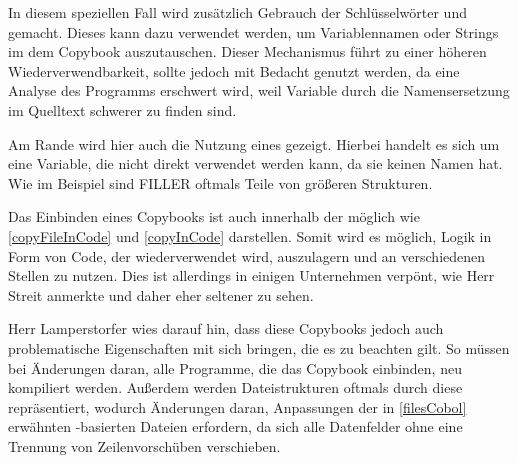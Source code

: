 In diesem speziellen Fall wird zusätzlich Gebrauch der Schlüsselwörter  und  gemacht. Dieses kann dazu verwendet werden, um Variablennamen oder Strings im dem Copybook auszutauschen. Dieser Mechanismus führt zu einer höheren Wiederverwendbarkeit, sollte jedoch mit Bedacht genutzt werden, da eine Analyse des Programms erschwert wird, weil Variable durch die Namensersetzung im Quelltext schwerer zu finden sind.

Am Rande wird hier auch die Nutzung eines  gezeigt. Hierbei handelt es sich um eine Variable, die nicht direkt verwendet werden kann, da sie keinen Namen hat. Wie im Beispiel sind FILLER oftmals Teile von größeren Strukturen.

Das Einbinden eines Copybooks ist auch innerhalb der  möglich wie \autoref{copyFileInCode} und \autoref{copyInCode} darstellen. Somit wird es möglich, Logik in Form von Code, der wiederverwendet wird, auszulagern und an verschiedenen Stellen zu nutzen. Dies ist allerdings in einigen Unternehmen verpönt, wie Herr Streit anmerkte und daher eher seltener zu sehen.



Herr Lamperstorfer wies darauf hin, dass diese Copybooks jedoch auch problematische Eigenschaften mit sich bringen, die es zu beachten gilt. So müssen bei Änderungen daran, alle Programme, die das Copybook einbinden, neu kompiliert werden. Außerdem werden Dateistrukturen oftmals durch diese repräsentiert, wodurch Änderungen daran, Anpassungen der in \autoref{filesCobol} erwähnten -basierten Dateien erfordern, da sich alle Datenfelder ohne eine Trennung von Zeilenvorschüben verschieben.

